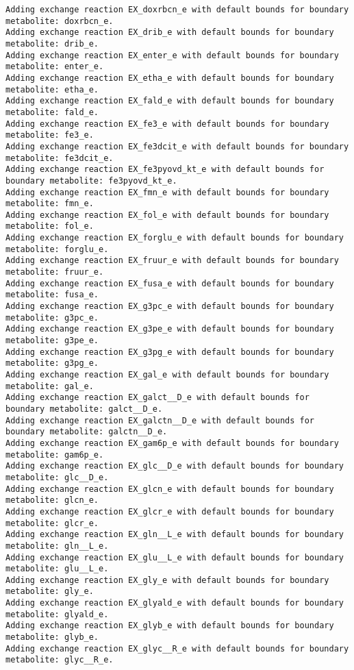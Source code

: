 \documentclass[
  letterpaper,
  DIV=11,
  numbers=noendperiod]{scrartcl}
\begin{document}
\begin{verbatim}
Adding exchange reaction EX_doxrbcn_e with default bounds for boundary metabolite: doxrbcn_e.
Adding exchange reaction EX_drib_e with default bounds for boundary metabolite: drib_e.
Adding exchange reaction EX_enter_e with default bounds for boundary metabolite: enter_e.
Adding exchange reaction EX_etha_e with default bounds for boundary metabolite: etha_e.
Adding exchange reaction EX_fald_e with default bounds for boundary metabolite: fald_e.
Adding exchange reaction EX_fe3_e with default bounds for boundary metabolite: fe3_e.
Adding exchange reaction EX_fe3dcit_e with default bounds for boundary metabolite: fe3dcit_e.
Adding exchange reaction EX_fe3pyovd_kt_e with default bounds for boundary metabolite: fe3pyovd_kt_e.
Adding exchange reaction EX_fmn_e with default bounds for boundary metabolite: fmn_e.
Adding exchange reaction EX_fol_e with default bounds for boundary metabolite: fol_e.
Adding exchange reaction EX_forglu_e with default bounds for boundary metabolite: forglu_e.
Adding exchange reaction EX_fruur_e with default bounds for boundary metabolite: fruur_e.
Adding exchange reaction EX_fusa_e with default bounds for boundary metabolite: fusa_e.
Adding exchange reaction EX_g3pc_e with default bounds for boundary metabolite: g3pc_e.
Adding exchange reaction EX_g3pe_e with default bounds for boundary metabolite: g3pe_e.
Adding exchange reaction EX_g3pg_e with default bounds for boundary metabolite: g3pg_e.
Adding exchange reaction EX_gal_e with default bounds for boundary metabolite: gal_e.
Adding exchange reaction EX_galct__D_e with default bounds for boundary metabolite: galct__D_e.
Adding exchange reaction EX_galctn__D_e with default bounds for boundary metabolite: galctn__D_e.
Adding exchange reaction EX_gam6p_e with default bounds for boundary metabolite: gam6p_e.
Adding exchange reaction EX_glc__D_e with default bounds for boundary metabolite: glc__D_e.
Adding exchange reaction EX_glcn_e with default bounds for boundary metabolite: glcn_e.
Adding exchange reaction EX_glcr_e with default bounds for boundary metabolite: glcr_e.
Adding exchange reaction EX_gln__L_e with default bounds for boundary metabolite: gln__L_e.
Adding exchange reaction EX_glu__L_e with default bounds for boundary metabolite: glu__L_e.
Adding exchange reaction EX_gly_e with default bounds for boundary metabolite: gly_e.
Adding exchange reaction EX_glyald_e with default bounds for boundary metabolite: glyald_e.
Adding exchange reaction EX_glyb_e with default bounds for boundary metabolite: glyb_e.
Adding exchange reaction EX_glyc__R_e with default bounds for boundary metabolite: glyc__R_e.

\end{verbatim}
\end{document}
